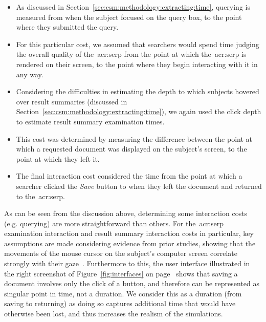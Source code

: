 \begin{itemize}
    \item{ As discussed in Section~\ref{sec:csm:methodology:extracting:time}, querying is measured from when the subject focused on the query box, to the point where they submitted the query.}
    \item{ For this particular cost, we assumed that searchers would spend time judging the overall quality of the~\gls{acr:serp} from the point at which the~\gls{acr:serp} is rendered on their screen, to the point where they begin interacting with it in any way.}
    \item{ Considering the difficulties in estimating the depth to which subjects hovered over result summaries (discussed in Section~\ref{sec:csm:methodology:extracting:time}), we again used the click depth to estimate result summary examination times.}
    \item{ This cost was determined by measuring the difference between the point at which a requested document was displayed on the subject's screen, to the point at which they left it.}
    \item{ The final interaction cost considered the time from the point at which a searcher clicked the \emph{Save} button to when they left the document and returned to the~\gls{acr:serp}.}
\end{itemize}

As can be seen from the discussion above, determining some interaction costs (e.g. querying) are more straightforward than others. For the~\gls{acr:serp} examination interaction and result summary interaction costs in particular, key assumptions are made considering evidence from prior studies, showing that the movements of the mouse cursor on the subject's computer screen correlate strongly with their gaze~\citep{chen2001mouse_cursor, smucker2014judging_relevance_movements}. Furthermore to this, the user interface illustrated in the right screenshot of Figure~\ref{fig:interfaces} on page~\pageref{fig:interfaces} shows that saving a document involves only the click of a button, and therefore can be represented as singular point in time, not a duration. We consider this as a duration (from saving to returning) as doing so captures additional time that would have otherwise been lost, and thus increases the realism of the simulations.

